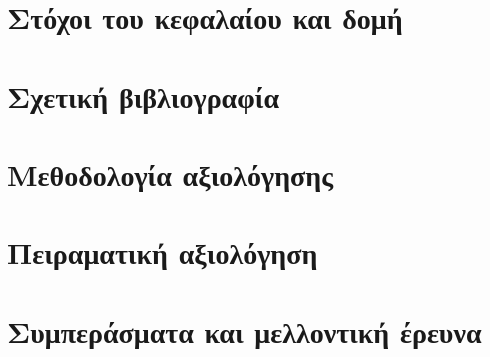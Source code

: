 \section{Στόχοι του κεφαλαίου και δομή}
  \label{section:02_01_01}

\section{Σχετική βιβλιογραφία}
  \label{section:02_01_02}
  

\section{Μεθοδολογία αξιολόγησης}
  \label{section:02_01_03}
  

\section{Πειραματική αξιολόγηση}
  \label{section:02_01_04}
  

\section{Συμπεράσματα και μελλοντική έρευνα}
  \label{section:02_01_05}
  
